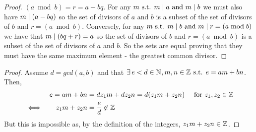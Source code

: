 \documentclass[MathsNotesBase.tex]{subfiles}
\begin{document}
{			
				\begin{proof}
				$(a \bmod b) = r = a - bq$. For any $m \text{ s.t. } m \mid a \text{ and } m \mid b$ we must also have $m \mid (a - bq)$ so the set of divisors of $a$ and $b$ is a subset of the set of divisors of $b$ and $r = (a \bmod b)$. Conversely, for any $m \text{ s.t. } m \mid b \text{ and } m \mid r = (a \bmod b)$ we have that $m \mid (bq + r) = a$ so the set of divisors of $b$ and $r = (a \bmod b)$ is a subset of the set of divisors of $a$ and $b$. So the sets are equal proving that they must have the same maximum element - the greatest common divisor.
				\end{proof}
			
			\begin{proof}
				Assume $d = gcd(a,b)$ and that $\exists\, e < d \in \mathbb{N}^{}, m,n \in \mathbb{Z}^{} \text{ s.t. } e = am + bn$. Then,
				\begin{align*}
					&&e = am + bn &= dz_1m + dz_2n = d(z_1m + z_2n) \hspace{10pt} \text{ for } z_1, z_2 \in \mathbb{Z}^{} \\
					&\iff &z_1m + z_2n &= \frac{e}{d} \not\in \mathbb{Z}^{}
				\end{align*}
				But this is impossible as, by the definition of the integers, $z_1m + z_2n \in \mathbb{Z}^{}$.
			\end{proof}
		}
	
\end{document}
